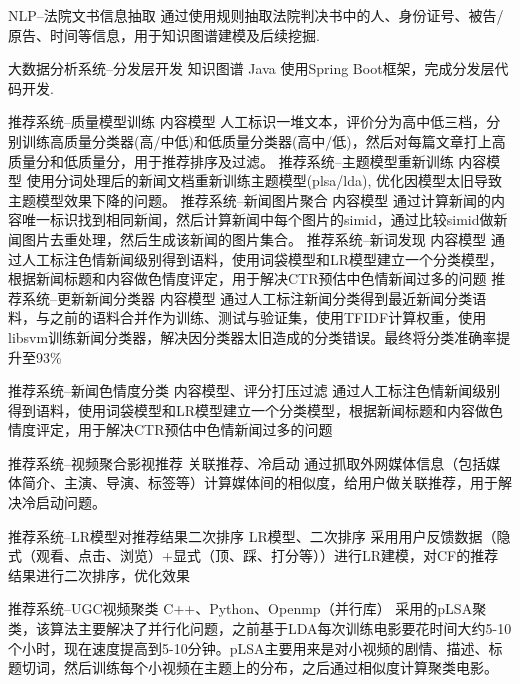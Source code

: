 \documentclass[11pt,a4paper]{moderncv}
\begin{document}

{NLP--法院文书信息抽取}
{}
{}{}
{通过使用规则抽取法院判决书中的人、身份证号、被告/原告、时间等信息，用于知识图谱建模及后续挖掘.}

{大数据分析系统--分发层开发}
{知识图谱}
{Java}{}
{使用Spring Boot框架，完成分发层代码开发.}

{推荐系统--质量模型训练}
{内容模型}
{}{}
{人工标识一堆文本，评价分为高中低三档，分别训练高质量分类器(高/中低)和低质量分类器(高中/低)，然后对每篇文章打上高质量分和低质量分，用于推荐排序及过滤。}
{推荐系统--主题模型重新训练}
{内容模型}
{}{}
{使用分词处理后的新闻文档重新训练主题模型(plsa/lda), 优化因模型太旧导致主题模型效果下降的问题。}
{推荐系统--新闻图片聚合}
{内容模型}
{}{}
{通过计算新闻的内容唯一标识找到相同新闻，然后计算新闻中每个图片的simid，通过比较simid做新闻图片去重处理，然后生成该新闻的图片集合。}
{推荐系统--新词发现}
{内容模型}
{}{}
{通过人工标注色情新闻级别得到语料，使用词袋模型和LR模型建立一个分类模型，根据新闻标题和内容做色情度评定，用于解决CTR预估中色情新闻过多的问题}
\vspace*{0.2\baselineskip}
{推荐系统--更新新闻分类器}
{内容模型}
{}{}
{通过人工标注新闻分类得到最近新闻分类语料，与之前的语料合并作为训练、测试与验证集，使用TFIDF计算权重，使用libsvm训练新闻分类器，解决因分类器太旧造成的分类错误。最终将分类准确率提升至93\%}

\vspace*{0.2\baselineskip}
{推荐系统--新闻色情度分类}
{内容模型、评分打压过滤}
{}{}
{通过人工标注色情新闻级别得到语料，使用词袋模型和LR模型建立一个分类模型，根据新闻标题和内容做色情度评定，用于解决CTR预估中色情新闻过多的问题}

\vspace*{0.2\baselineskip}
{推荐系统--视频聚合影视推荐}
{关联推荐、冷启动}
{}{}
{通过抓取外网媒体信息（包括媒体简介、主演、导演、标签等）计算媒体间的相似度，给用户做关联推荐，用于解决冷启动问题。}

\vspace*{0.2\baselineskip}
{推荐系统--LR模型对推荐结果二次排序}
{LR模型、二次排序}
{}{}
{采用用户反馈数据（隐式（观看、点击、浏览）+显式（顶、踩、打分等））进行LR建模，对CF的推荐结果进行二次排序，优化效果}

\vspace*{0.2\baselineskip}
{推荐系统--UGC视频聚类}
{C++、Python、Openmp（并行库）}
{}{}
{采用的pLSA聚类，该算法主要解决了并行化问题，之前基于LDA每次训练电影要花时间大约5-10个小时，现在速度提高到5-10分钟。pLSA主要用来是对小视频的剧情、描述、标题切词，然后训练每个小视频在主题上的分布，之后通过相似度计算聚类电影。}
\end{document}
